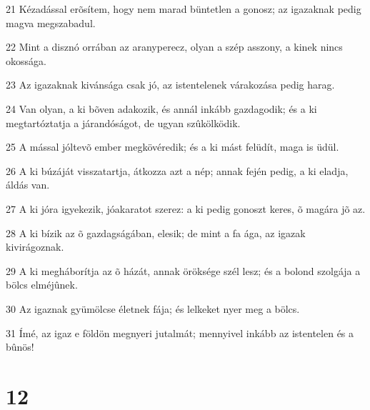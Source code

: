 \par 21 Kézadással erõsítem, hogy nem marad büntetlen a gonosz; az igazaknak pedig magva megszabadul.
\par 22 Mint a disznó orrában az aranyperecz, olyan a szép asszony, a kinek nincs okossága.
\par 23 Az igazaknak kivánsága csak jó, az istentelenek várakozása pedig harag.
\par 24 Van olyan, a ki bõven adakozik, és annál inkább gazdagodik; és a ki megtartóztatja a járandóságot, de ugyan szûkölködik.
\par 25 A mással jóltevõ ember megkövéredik; és a ki mást felüdít, maga is üdül.
\par 26 A ki búzáját visszatartja, átkozza azt a nép; annak  fején pedig, a ki eladja, áldás van.
\par 27 A ki jóra igyekezik, jóakaratot szerez: a ki pedig gonoszt keres, õ magára jõ az.
\par 28 A ki bízik az õ gazdagságában, elesik; de mint a fa ága, az  igazak kivirágoznak.
\par 29 A ki megháborítja az õ házát, annak öröksége szél lesz; és a bolond szolgája a bölcs elméjûnek.
\par 30 Az igaznak gyümölcse életnek fája; és lelkeket nyer meg a bölcs.
\par 31 Ímé, az igaz e földön megnyeri jutalmát; mennyivel inkább az istentelen és a bûnös!

\chapter{12}

